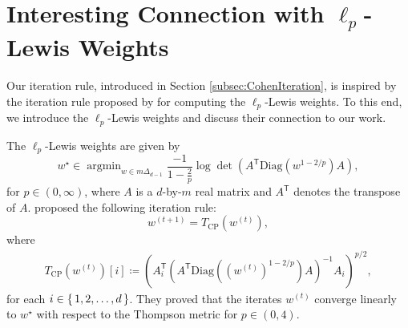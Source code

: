 \documentclass{article}
\DeclareMathOperator*{\argmin}{ \arg \min }
\renewcommand{\intercal}{\mathsf{\scriptscriptstyle{T}}}
\begin{document}
\section{Interesting Connection with $\ell_p$-Lewis Weights}
\label{subsec:RelationWithCP}
Our iteration rule, introduced in Section \ref{subsec:CohenIteration}, is inspired by the iteration rule 
proposed by
\citet{Cohen2015} for computing the $\ell_p$-Lewis weights. 
To this end, we introduce the $\ell_p$-Lewis weights and discuss their connection to our work.

The $\ell_p$-Lewis weights are given by \cite{Lee2020}
\begin{equation}
    \label{eq:LewisDef}
    w^{\star}\in\argmin_{w\in m \Delta_{d-1}}\frac{-1}{1-\frac{2}{p}}\log\det\left(A^{\intercal}\mathrm{Diag}\left(w^{1-2/p}\right)A\right),
\end{equation}
for $p\in(0,\infty)$, where $A$ is a $d$-by-$m$ real matrix and $A^\intercal$ denotes the transpose of $A$.
\citet{Cohen2015} proposed the following iteration rule: 
\begin{equation}
    \label{eq:CPIterDef}
    w^{(t+1)}=T_{\mathrm{CP}}\left(w^{(t)}\right),
\end{equation}
where
\begin{align}
    T_{\mathrm{CP}}\left(w^{(t)}\right)[i]\coloneqq\left(A_i^{\intercal}\left(A^{\intercal}\mathrm{Diag}\left(\left(w^{(t)}\right)^{1-2/p}\right)A\right)^{-1}A_i\right)^{p/2},
\end{align}
for each $i\in\set{1,2,\dots,d}$.
They proved that 
the 
iterates 
$w^{(t)}$
converge linearly to 
$w^{\star}$
with respect to the Thompson metric for $p\in(0,4)$.
\end{document}
